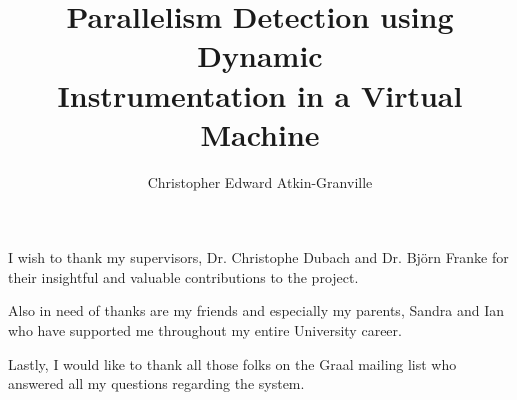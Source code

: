 \documentclass[msc,cs,parskip,leftchapter,logo,twoside,abbrevs,11pt]{infthesis}
\title{Parallelism Detection using Dynamic\\Instrumentation in a Virtual Machine}
\author{Christopher Edward Atkin-Granville}
\begin{document}
	\begin{preliminary}
		\maketitle
		\begin{acknowledgements}
		I wish to thank my supervisors, Dr. Christophe Dubach and Dr. Bj\"{o}rn Franke for their insightful and valuable contributions to the project.

		Also in need of thanks are my friends and especially my parents, Sandra and Ian who have supported me throughout my entire University career.
		
		Lastly, I would like to thank all those folks on the Graal mailing list who answered all my questions regarding the system.
		\end{acknowledgements}
		\standarddeclaration
		\dedication{To my grandfathers, Leslie and John.}
		\tableofcontents
		\listoffigures
	\end{preliminary}

	
	
	
	
	
	
	
	
	
	\appendix
	
	
		
	

	\singlespace
	
	
\end{document}
